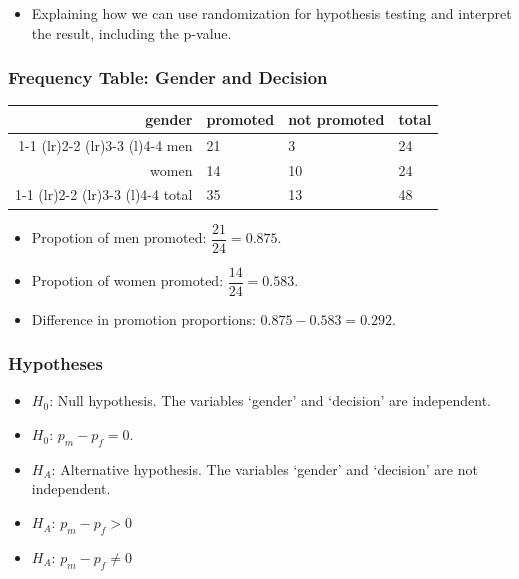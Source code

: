 \documentclass{beamer}
\begin{document}
\begin{frame}
  \begin{itemize}
    \item[] 
      Explaining how we can use randomization for hypothesis testing
      and interpret the result, including the p-value.
  \end{itemize}
\end{frame}

\begin{frame}
  \frametitle{Frequency Table: Gender and Decision}
  \begin{table}
    \begin{tabular}{@{}rlll@{}}
      \toprule
      gender & promoted & not promoted & total \\ 
      \cmidrule(r){1-1} \cmidrule(lr){2-2} \cmidrule(lr){3-3}
      \cmidrule(l){4-4}
      men & 21 & 3 & 24 \\[0.3em]
      women & 14 & 10 & 24 \\[0.3em]
      \cmidrule(r){1-1} \cmidrule(lr){2-2} \cmidrule(lr){3-3}
      \cmidrule(l){4-4}
      total & 35 & 13 & 48 \\[0.3em]
      \bottomrule
    \end{tabular}
  \end{table}
  \begin{itemize}
    \item[] Propotion of men promoted: $\dfrac{21}{24} = 0.875$. 
      \vspace{0.5cm}
    \item[] Propotion of women promoted: $\dfrac{14}{24} = 0.583$. 
      \vspace{0.5cm}
    \item[] Difference in promotion proportions: $0.875 - 0.583 = 0.292$.
  \end{itemize}
\end{frame}

\begin{frame}
  \frametitle{Hypotheses}
  \begin{itemize}
    \item[] $H_0$: Null hypothesis. The variables `gender' and
    `decision' are independent. 
      \vspace{0.5cm}
    \item[] $H_0$: $p_m - p_f = 0$. 
      \vspace{0.5cm}
    \item[] $H_A$: Alternative hypothesis. The variables `gender' and
    `decision' are not independent. 
      \vspace{0.5cm}
    \item[] $H_A$: $p_m - p_f > 0$
      \vspace{0.5cm}
    \item[] $H_A$: $p_m - p_f \neq 0$
  \end{itemize}
\end{frame}
\end{document}
